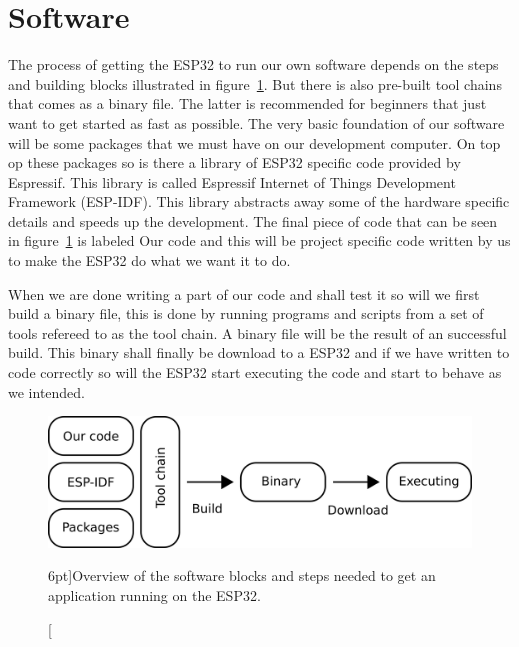 \documentclass{tufte-book}
\begin{document}
\section{Software}\label{sec:software}

The process of getting the ESP32 to run our own software depends on the steps and building blocks illustrated in figure~\ref{fig:software_anatomy}.
But there is also pre-built tool chains that comes as a binary file. The latter is recommended for beginners that just want to get started as fast as possible.
The very basic foundation of our software will be some packages that we must have on our development computer. On top op these packages so is there a library of ESP32 specific code provided by Espressif. This library is called Espressif Internet of Things Development Framework (ESP-IDF). This library abstracts away some of the hardware specific details and speeds up the development. The final piece of code that can be seen in figure~\ref{fig:software_anatomy} is labeled Our code and this will be project specific code written by us to make the ESP32 do what we want it to do.

When we are done writing a part of our code and shall test it so will we first build a binary file, this is done by running programs and scripts from a set of tools refereed to as the tool chain. A binary file will be the result of an successful build. This binary shall finally be download to a ESP32 and if we have written to code correctly so will the ESP32 start executing the code and start to behave as we intended. 

\begin{figure}
	\includegraphics[scale=1.0]{software_anatomy.png}
	\caption[Software development $n$.][6pt]{Overview of the software blocks and steps needed to get an application running on the ESP32.}
	\label{fig:software_anatomy}
\end{figure}
\end{document}
